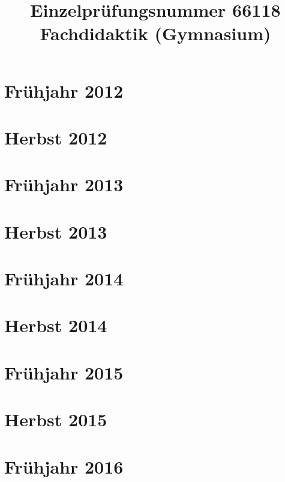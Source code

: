 \documentclass{lehramt-informatik-examen-sammlung}
\title{Einzelprüfungsnummer 66118\\Fachdidaktik (Gymnasium)}
\begin{document}
\maketitle
\tableofcontents

\section{Frühjahr 2012}


\section{Herbst 2012}


\section{Frühjahr 2013}


\section{Herbst 2013}


\section{Frühjahr 2014}


\section{Herbst 2014}


\section{Frühjahr 2015}


\section{Herbst 2015}


\section{Frühjahr 2016}

\end{document}
